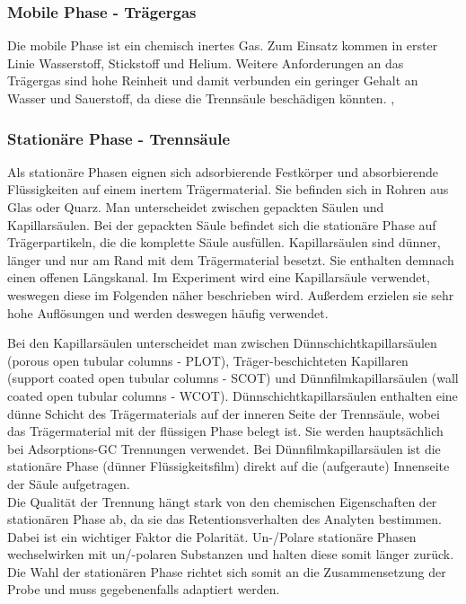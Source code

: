    \subsubsection{Mobile Phase - Trägergas}
      
      Die mobile Phase ist ein chemisch inertes Gas. Zum Einsatz kommen in erster Linie Wasserstoff, Stickstoff und Helium. Weitere Anforderungen an das Trägergas sind hohe Reinheit und damit verbunden ein geringer Gehalt an Wasser und Sauerstoff, da diese die Trennsäule beschädigen könnten. \citep{Versuchsvorschrift}, \citep{Taschenatlas}
      
    \subsubsection{Stationäre Phase - Trennsäule}
      
      Als stationäre Phasen eignen sich adsorbierende Festkörper und absorbierende Flüssigkeiten auf einem inertem Trägermaterial. Sie befinden sich in Rohren aus Glas oder Quarz. Man unterscheidet zwischen gepackten Säulen und Kapillarsäulen. Bei der gepackten Säule befindet sich die stationäre Phase auf Trägerpartikeln, die die komplette Säule ausfüllen. Kapillarsäulen sind dünner, länger und nur am Rand mit dem Trägermaterial besetzt. Sie enthalten demnach einen offenen Längskanal. Im Experiment wird eine Kapillarsäule verwendet, weswegen diese im Folgenden näher beschrieben wird. Außerdem erzielen sie sehr hohe Auflösungen und werden deswegen häufig verwendet.
      
      Bei den Kapillarsäulen unterscheidet man zwischen Dünnschichtkapillarsäulen (porous open tubular columns - PLOT), Träger-beschichteten Kapillaren (support coated open tubular columns - SCOT) und Dünnfilmkapillarsäulen (wall coated open tubular columns - WCOT). Dünnschichtkapillarsäulen enthalten eine dünne Schicht des Trägermaterials auf der inneren Seite der Trennsäule, wobei das Trägermaterial mit der flüssigen Phase belegt ist. Sie werden hauptsächlich bei Adsorptions-GC Trennungen verwendet. Bei Dünnfilmkapillarsäulen ist die stationäre Phase (dünner Flüssigkeitsfilm) direkt auf die (aufgeraute) Innenseite der Säule aufgetragen. \citep[S. 164-166]{Taschenatlas} \\
      
      Die Qualität der Trennung hängt stark von den chemischen Eigenschaften der stationären Phase ab, da sie das Retentionsverhalten des Analyten bestimmen. Dabei ist ein wichtiger Faktor die Polarität. Un-/Polare stationäre Phasen wechselwirken mit un/-polaren Substanzen und halten diese somit länger zurück. Die Wahl der stationären Phase richtet sich somit an die Zusammensetzung der Probe und muss gegebenenfalls adaptiert werden. \citep{Versuchsvorschrift}
      
